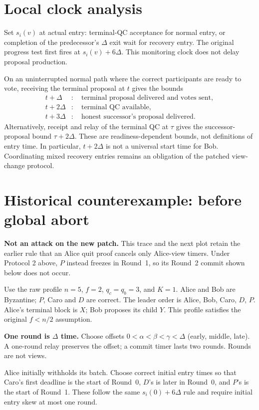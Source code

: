 \documentclass[10pt,a4paper]{article}
\begin{document}
\section*{Local clock analysis}
Set $s_i(v)$ at actual entry: terminal-QC acceptance for normal entry, or
completion of the predecessor's $\Delta$ exit wait for recovery entry.
The original progress test first fires at $s_i(v)+6\Delta$. This monitoring
clock does not delay proposal production.

On an uninterrupted normal path where the correct participants are ready
to vote, receiving the terminal proposal at $t$ gives the bounds
\[
\begin{aligned}
 t+\Delta &: \quad\text{terminal proposal delivered and votes sent},\\
 t+2\Delta &: \quad\text{terminal QC available},\\
 t+3\Delta &: \quad\text{honest successor's proposal delivered}.
\end{aligned}
\]
Alternatively, receipt and relay of the terminal QC at $\tau$ gives the
successor-proposal bound $\tau+2\Delta$. These are readiness-dependent
bounds, not definitions of entry time. In particular, $t+2\Delta$ is not
a universal start time for Bob. Coordinating mixed recovery entries remains
an obligation of the patched view-change protocol.

\section*{Historical counterexample: before global abort}
\textbf{Not an attack on the new patch.} This trace and the next plot retain
the earlier rule that an Alice quit proof cancels only Alice-view timers.
Under Protocol 2 above, $P$ instead freezes in Round~1, so its Round~2
commit shown below does not occur.

Use the raw profile $n=5$, $f=2$, $q_c=q_b=3$, and $K=1$.
Alice and Bob are Byzantine; $P$, Caro and $D$ are correct. The leader order
is Alice, Bob, Caro, $D$, $P$. Alice's terminal block is $X$; Bob proposes
its child $Y$. This profile satisfies the original $f<n/2$ assumption.

\textbf{One round is $\Delta$ time.} Choose offsets
$0<\alpha<\beta<\gamma<\Delta$ (early, middle, late). A one-round relay
preserves the offset; a commit timer lasts two rounds. Rounds are not views.

Alice initially withholds its batch. Choose correct initial entry times
so that Caro's first deadline is the start of Round~0, $D$'s is later in
Round~0, and $P$'s is the start of Round~1. These follow the same
$s_i(0)+6\Delta$ rule and require initial entry skew at most one round.
\end{document}
